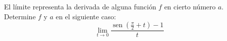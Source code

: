 \item El límite representa la derivada de alguna función $f$ en cierto número $a$. Determine $f$ y $a$ en el siguiente caso:
$$\lim_{t \to 0} \frac{\operatorname{sen}(\frac{\pi}{2} + t) - 1}{t}$$
